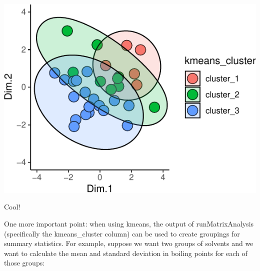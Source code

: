 \documentclass[
]{krantz}
\begin{document}
\begin{center}\includegraphics[width=0.8\linewidth]{index_files/figure-latex/unnamed-chunk-108-1} \end{center}

Cool!

One more important point: when using kmeans, the output of runMatrixAnalysis (specifically the kmeans\_cluster column) can be used to create groupings for summary statistics. For example, suppose we want two groups of solvents and we want to calculate the mean and standard deviation in boiling points for each of those groups:
\end{document}
